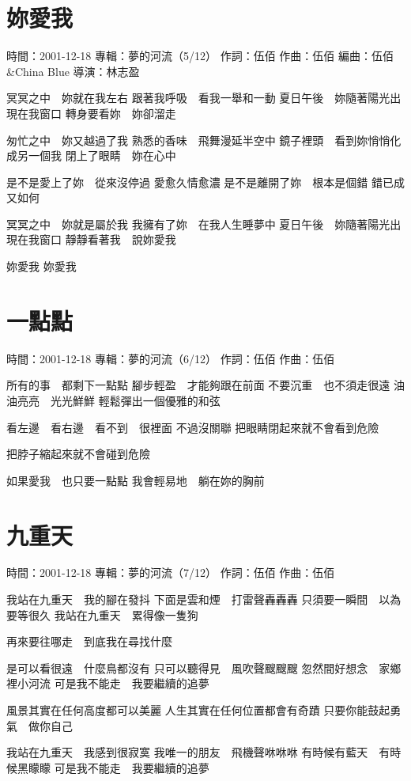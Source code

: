 \documentclass[UTF8,a4paper,oneside,twocolumn,12pt]{ctexbook}
\newcommand{\infopair}[2]{\textbullet #1：#2}
\newcommand{\zc}[1][伍佰]{\infopair{作詞}{#1}}
\newcommand{\zq}[1][伍佰]{\infopair{作曲}{#1}}
\newcommand{\bq}[1][伍佰]{\infopair{編曲}{#1}}
\newcommand{\zj}[1]{\infopair{專輯}{#1}}
\newcommand{\sj}[1]{\infopair{時間}{#1}}
\newenvironment{info}{\begin{flushleft}\kaishu
	}
	{\end{flushleft}\normalsize\yahei\par}
\newenvironment{lyric}{
	}
{}
\begin{document}
\section{妳愛我}
\begin{info}
	\sj{2001-12-18}
	\zj{夢的河流（5/12）}
	\zc
	\zq
	\bq[伍佰\&China Blue]
	\infopair{導演}{林志盈}
\end{info}
\begin{lyric}
	冥冥之中　妳就在我左右
	跟著我呼吸　看我一舉和一動
	夏日午後　妳隨著陽光出現在我窗口
	轉身要看妳　妳卻溜走

	匆忙之中　妳又越過了我
	熟悉的香味　飛舞漫延半空中
	鏡子裡頭　看到妳悄悄化成另一個我
	閉上了眼睛　妳在心中

	是不是愛上了妳　從來沒停過
	愛愈久情愈濃
	是不是離開了妳　根本是個錯
	錯已成又如何

	冥冥之中　妳就是屬於我
	我擁有了妳　在我人生睡夢中
	夏日午後　妳隨著陽光出現在我窗口
	靜靜看著我　說妳愛我

	妳愛我
	妳愛我
\end{lyric}

\section{一點點}
\begin{info}
	\sj{2001-12-18}
	\zj{夢的河流（6/12）}
	\zc
	\zq
\end{info}
\begin{lyric}
	所有的事　都剩下一點點
	腳步輕盈　才能夠跟在前面
	不要沉重　也不須走很遠
	油油亮亮　光光鮮鮮
	輕鬆彈出一個優雅的和弦

	看左邊　看右邊　看不到　很裡面
	不過沒關聯
	把眼睛閉起來就不會看到危險

	把脖子縮起來就不會碰到危險

	如果愛我　也只要一點點
	我會輕易地　躺在妳的胸前
\end{lyric}

\section{九重天}
\begin{info}
	\sj{2001-12-18}
	\zj{夢的河流（7/12）}
	\zc
	\zq
\end{info}
\begin{lyric}
	我站在九重天　我的腳在發抖
	下面是雲和煙　打雷聲轟轟轟
	只須要一瞬間　以為要等很久
	我站在九重天　累得像一隻狗

	再來要往哪走　到底我在尋找什麼

	是可以看很遠　什麼鳥都沒有
	只可以聽得見　風吹聲颼颼颼
	忽然間好想念　家鄉裡小河流
	可是我不能走　我要繼續的追夢

	風景其實在任何高度都可以美麗
	人生其實在任何位置都會有奇蹟
	只要你能鼓起勇氣　做你自己

	我站在九重天　我感到很寂寞
	我唯一的朋友　飛機聲咻咻咻
	有時候有藍天　有時候黑矇矇
	可是我不能走　我要繼續的追夢
\end{lyric}
\end{document}
